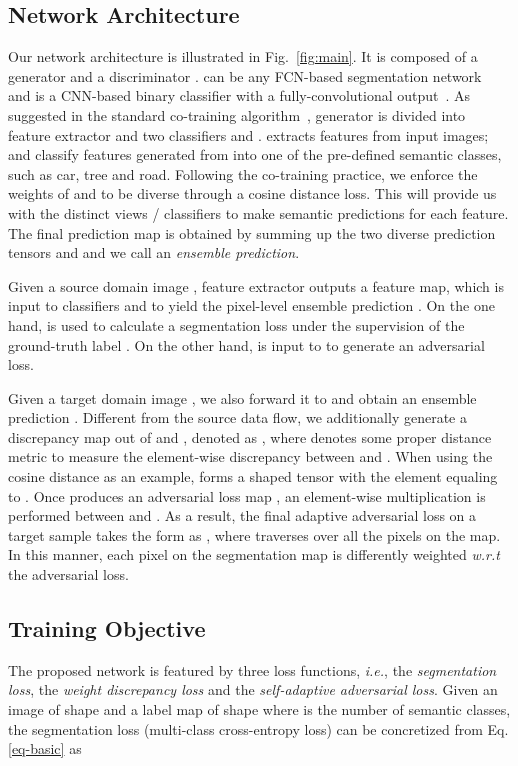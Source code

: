 \documentclass[10pt,twocolumn,letterpaper]{article}
\begin{document}
\subsection{Network Architecture} \label{Network architecture}
Our network architecture is illustrated in Fig.~\ref{fig:main}. It is composed of a generator  and a discriminator .  can be any FCN-based segmentation network~\cite{simonyan2014vgg, long2015fcn, chen2018deeplab} and  is a CNN-based binary classifier with a fully-convolutional output~\cite{goodfellow2014gan}. As suggested in the standard co-training algorithm~\cite{zhou2005cotrain}, generator  is divided into feature extractor  and two classifiers  and .  extracts features from input images;  and  classify features generated from  into one of the pre-defined semantic classes, such as car, tree and road. Following the co-training practice, we enforce the weights of  and  to be diverse through a cosine distance loss. This will provide us with the distinct views / classifiers to make semantic predictions for each feature. The final prediction map  is obtained by summing up the two diverse prediction tensors  and  and we call  an \emph{ensemble prediction}.

Given a source domain image , feature extractor  outputs a feature map, which is input to classifiers  and  to yield the pixel-level ensemble prediction . On the one hand,  is used to calculate a segmentation loss under the supervision of the ground-truth label . On the other hand,  is input to  to generate an adversarial loss. 

Given a target domain image , we also forward it to  and obtain an ensemble prediction . Different from the source data flow, we additionally generate a discrepancy map out of  and , denoted as , where  denotes some proper distance metric to measure the element-wise discrepancy between  and . When using the cosine distance as an example,  forms a  shaped tensor with the  element equaling to . Once  produces an adversarial loss map , an element-wise multiplication is performed between  and . As a result, the final adaptive adversarial loss on a target sample takes the form as , where  traverses over all the pixels on the map. In this manner, each pixel on the segmentation map is differently weighted \emph{w.r.t} the adversarial loss.

\subsection{Training Objective} \label{Training objective}
The proposed network is featured by three loss functions, \emph{i.e.}, the \emph{segmentation loss}, the \emph{weight discrepancy loss} and the \emph{self-adaptive adversarial loss}. Given an image  of shape   and a label map  of shape  where  is the number of semantic classes, the segmentation loss (multi-class cross-entropy loss) can be concretized from Eq. \ref{eq-basic} as
\end{document}
